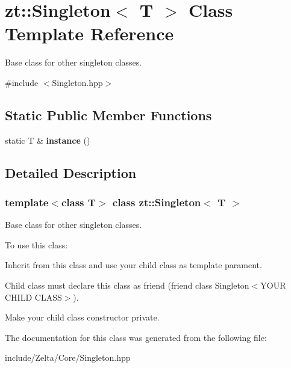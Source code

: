 \hypertarget{classzt_1_1_singleton}{}\section{zt\+:\+:Singleton$<$ T $>$ Class Template Reference}
\label{classzt_1_1_singleton}


Base class for other singleton classes.  




{\ttfamily \#include $<$Singleton.\+hpp$>$}

\subsection*{Static Public Member Functions}
\begin{DoxyCompactItemize}
\item 
\mbox{\label{classzt_1_1_singleton_a1387e69646cc1af08e1695bc70f63084}} 
static T \& {\bfseries instance} ()
\end{DoxyCompactItemize}


\subsection{Detailed Description}
\subsubsection*{template$<$class T$>$\newline
class zt\+::\+Singleton$<$ T $>$}

Base class for other singleton classes. 

To use this class\+:
\begin{DoxyEnumerate}
\item Inherit from this class and use your child class as template parament.
\item Child class must declare this class as friend (friend class Singleton$<$\+Y\+O\+U\+R C\+H\+I\+L\+D C\+L\+A\+S\+S$>$).
\item Make your child class constructor private. 
\end{DoxyEnumerate}

The documentation for this class was generated from the following file\+:\begin{DoxyCompactItemize}
\item 
include/\+Zelta/\+Core/Singleton.\+hpp\end{DoxyCompactItemize}
